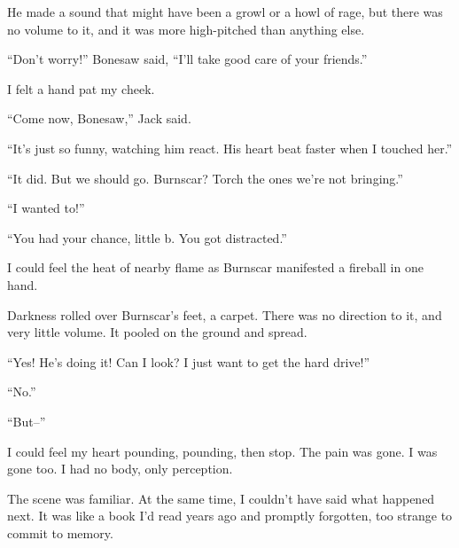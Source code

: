 He made a sound that might have been a growl or a howl of rage, but there was no volume to it, and it was more high-pitched than anything else.



``Don't worry!''  Bonesaw said, ``I'll take good care of your friends.''



I felt a hand pat my cheek.



``Come now, Bonesaw,'' Jack said.



``It's just so funny, watching him react.  His heart beat faster when I touched her.''



``It did.  But we should go.  Burnscar?  Torch the ones we're not bringing.''



``I wanted to!''



``You had your chance, little b.  You got distracted.''



I could feel the heat of nearby flame as Burnscar manifested a fireball in one hand.



Darkness rolled over Burnscar's feet, a carpet.  There was no direction to it, and very little volume.  It pooled on the ground and spread.



``Yes!  He's doing it!  Can I look?  I just want to get the hard drive!''



``No.''



``But--''



I could feel my heart pounding, pounding, then stop.  The pain was gone.  I was gone too.  I had no body, only perception.



The scene was familiar.  At the same time, I couldn't have said what happened next.  It was like a book I'd read years ago and promptly forgotten, too strange to commit to memory.



